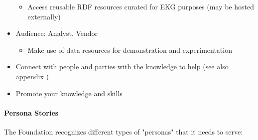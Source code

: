 \begin{description}[font=\bfseries,nosep,leftmargin=!,labelwidth=\widthof{\bfseries Member Directory \& Services}]
\begin{itemize}
                \begin{itemize}
                    \item Access reusable RDF resources curated for EKG purposes (may be hosted externally)
                \end{itemize}
            \item Audience: Analyst, Vendor
                \begin{itemize}
                    \item Make use of data resources for demonstration and experimentation
                \end{itemize}
        \end{itemize}
    \item[Member Directory \& Services]
        \begin{itemize}
            \item Connect with people and parties with the knowledge to help
                  (see also appendix )
            \item Promote your knowledge and skills
        \end{itemize}
\end{description}

\paragraph{Persona Stories}

The Foundation recognizes different types of "personas" that it needs to serve:

